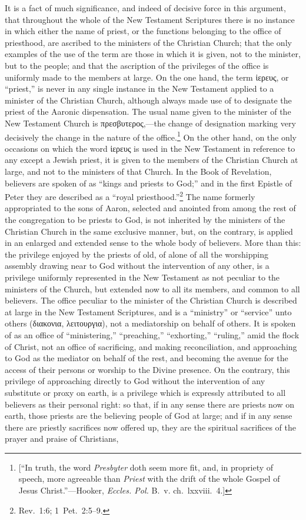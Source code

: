 \documentclass[
  english,
]{book}
\newcommand{\textgreek}[2][]{\foreignlanguage{greek}{#2}}
\begin{document}
It is a fact of much significance, and indeed of decisive force in this argument, that throughout the whole of the New Testament Scriptures there is no instance in which either the name of priest, or the functions belonging to the office of priesthood, are ascribed to the ministers of the Christian Church; that the only examples of the use of the term are those in which it is given, not to the minister, but to the people; and that the ascription of the privileges of the office is uniformly made to the members at large. On the one hand, the term \textgreek{ἱερευς}, or ``priest,'' is never in any single instance in the New Testament applied to a minister of the Christian Church, although always made use of to designate the priest of the Aaronic dispensation. The usual name given to the minister of the New Testament Church is \textgreek{πρεσβυτερος},---the change of designation marking very decisively the change in the nature of the office.\footnote{{[}``In truth, the word \emph{Presbyter} doth seem more fit, and, in propriety of speech, more agreeable than \emph{Priest} with the drift of the whole Gospel of Jesus Christ.''---Hooker, \emph{Eccles. Pol.} B.~v. ch.~lxxviii.~4.{]}} On the other hand, on the only occasions on which the word \textgreek{ἱερευς} is used in the New Testament in reference to any except a Jewish priest, it is given to the members of the Christian Church at large, and not to the ministers of that Church. In the Book of Revelation, believers are spoken of as ``kings and priests to God;'' and in the first Epistle of Peter they are described as a ``royal priesthood.''\footnote{Rev.~1:6; 1~Pet.~2:5--9.} The name formerly appropriated to the sons of Aaron, selected and anointed from among the rest of the congregation to be priests to God, is not inherited by the ministers of the Christian Church in the same exclusive manner, but, on the contrary, is applied in an enlarged and extended sense to the whole body of believers. More than this: the privilege enjoyed by the priests of old, of alone of all the worshipping assembly drawing near to God without the intervention of any other, is a privilege uniformly represented in the New Testament as not peculiar to the ministers of the Church, but extended now to all its members, and common to all believers. The office peculiar to the minister of the Christian Church is described at large in the New Testament Scriptures, and is a ``ministry'' or ``service'' unto others (\textgreek{διακονια, λειτουργια}), not a mediatorship on behalf of others. It is spoken of as an office of ``ministering,'' ``preaching,'' ``exhorting,'' ``ruling,'' amid the flock of Christ, not an office of sacrificing, and making reconciliation, and approaching to God as the mediator on behalf of the rest, and becoming the avenue for the access of their persons or worship to the Divine presence. On the contrary, this privilege of approaching directly to God without the intervention of any substitute or proxy on earth, is a privilege which is expressly attributed to all believers as their personal right: so that, if in any sense there are priests now on earth, those priests are the believing people of God at large; and if in any sense there are priestly sacrifices now offered up, they are the spiritual sacrifices of the prayer and praise of Christians, 
\end{document}
